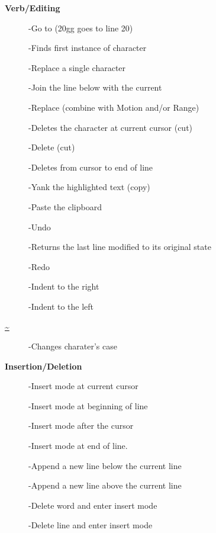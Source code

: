 \documentclass{article}
\begin{document}
\begin{multicols}{2}



\begin{center}
\textbf{Verb/Editing}
\end{center}
\begin{description}
\item[]
-Go to (20gg goes to line 20)
\item[]
-Finds first instance of character
\item[] 
-Replace a single character
\item[] 
-Join the line below with the current
\item[]
-Replace (combine with Motion and/or Range)
\item[]
-Deletes the character at current cursor (cut)
\item[]
-Delete (cut)
\item[]
-Deletes from cursor to end of line
\item[]
-Yank the highlighted text (copy)
\item[]
-Paste the clipboard
\item[]
-Undo
\item[] 
-Returns the last line modified to its original state
\item[]
-Redo
\item[\ttfamily{\textgreater}]
-Indent to the right
\item[\ttfamily{\textless}]
-Indent to the left
\item[\url{~}]
-Changes charater's case
\end{description}
\begin{center}
\textbf{Insertion/Deletion}
\end{center}
\begin{description}
\item[]
-Insert mode at current cursor
\item[] 
-Insert mode at beginning of line
\item[]
-Insert mode after the cursor
\item[]
-Insert mode at end of line.
\item[]
-Append a new line below the current line
\item[]
-Append a new line above the current line
\item[]
-Delete word and enter insert mode
\item[]
-Delete line and enter insert mode
\end{description}
\columnbreak


\end{multicols}
\end{document}
